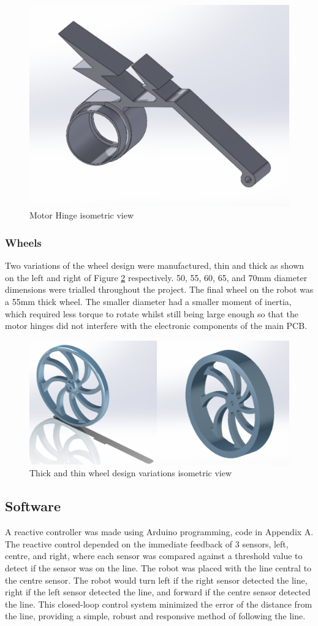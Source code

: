 \documentclass{article}
\begin{document}
\begin{figure}[H]
    \centering
    \includegraphics[width=0.3\linewidth]{REPORT/MotorHinge.png}
    \caption{Motor Hinge isometric view}
    \label{fig:Motorhinge}
\end{figure}

\subsubsection{Wheels}
Two variations of the wheel design were manufactured, thin and thick as shown on the left and right of Figure \ref{fig:Wheels} respectively. 50, 55, 60, 65, and 70mm diameter dimensions were trialled throughout the project. The final wheel on the robot was a 55mm thick wheel. The smaller diameter had a smaller moment of inertia, which required less torque to rotate whilst still being large enough so that the motor hinges did not interfere with the electronic components of the main PCB. 

\begin{figure}[H]
    \centering
    \includegraphics[width=0.5\linewidth]{REPORT/Wheels.png}
    \caption{Thick and thin wheel design variations isometric view}
    \label{fig:Wheels}
\end{figure}

\subsection{Software}
A reactive controller was made using Arduino programming, code in Appendix A. The reactive control depended on the immediate feedback of 3 sensors, left, centre, and right, where each sensor was compared against a threshold value to detect if the sensor was on the line. The robot was placed with the line central to the centre sensor. The robot would turn left if the right sensor detected the line, right if the left sensor detected the line, and forward if the centre sensor detected the line. This closed-loop control system minimized the error of the distance from the line, providing a simple, robust and responsive method of following the line.  
\end{document}
